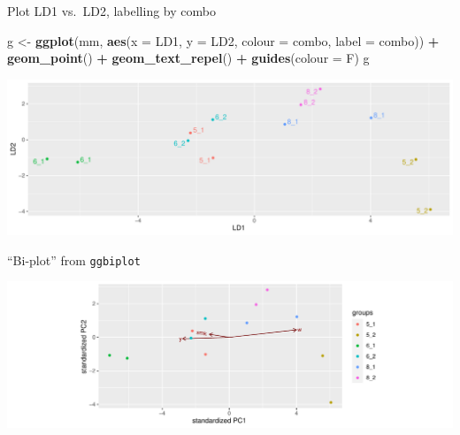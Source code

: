 \documentclass[
  ignorenonframetext,
]{beamer}
\newenvironment{Shaded}{\begin{snugshade}}{\end{snugshade}}
\newcommand{\DataTypeTok}[1]{\textcolor[rgb]{0.13,0.29,0.53}{#1}}
\newcommand{\FloatTok}[1]{\textcolor[rgb]{0.00,0.00,0.81}{#1}}
\newcommand{\KeywordTok}[1]{\textcolor[rgb]{0.13,0.29,0.53}{\textbf{#1}}}
\newcommand{\NormalTok}[1]{#1}
\newcommand{\OperatorTok}[1]{\textcolor[rgb]{0.81,0.36,0.00}{\textbf{#1}}}
\newcommand{\StringTok}[1]{\textcolor[rgb]{0.31,0.60,0.02}{#1}}
\begin{document}
\begin{frame}[fragile]{Plot LD1 vs.~LD2, labelling by combo}
\protect\hypertarget{plot-ld1-vs.-ld2-labelling-by-combo}{}

\begin{Shaded}
\begin{Highlighting}[]
\NormalTok{g <-}\StringTok{ }\KeywordTok{ggplot}\NormalTok{(mm, }\KeywordTok{aes}\NormalTok{(}\DataTypeTok{x =}\NormalTok{ LD1, }\DataTypeTok{y =}\NormalTok{ LD2, }\DataTypeTok{colour =}\NormalTok{ combo, }
                    \DataTypeTok{label =}\NormalTok{ combo)) }\OperatorTok{+}\StringTok{ }\KeywordTok{geom_point}\NormalTok{() }\OperatorTok{+}
\StringTok{  }\KeywordTok{geom_text_repel}\NormalTok{() }\OperatorTok{+}\StringTok{ }\KeywordTok{guides}\NormalTok{(}\DataTypeTok{colour =}\NormalTok{ F)}
\NormalTok{g}
\end{Highlighting}
\end{Shaded}

\includegraphics{slides_d29_files/figure-beamer/unnamed-chunk-321-1.pdf}

\end{frame}

\begin{frame}[fragile]{``Bi-plot'' from \texttt{ggbiplot}}
\protect\hypertarget{bi-plot-from-ggbiplot}{}

\begin{Shaded}
\end{Shaded}

\includegraphics{slides_d29_files/figure-beamer/unnamed-chunk-322-1.pdf}

\end{frame}
\end{document}
